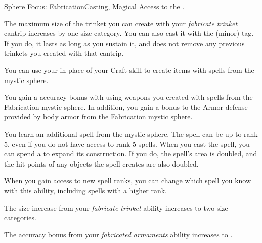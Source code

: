   \begin{magicalfeat}{Sphere Focus: Fabrication}{Casting, Magical}
    \featpre Access to the  .

     The maximum size of the trinket you can create with your \textit{fabricate trinket} cantrip increases by one size category.
    You can also cast it with the  (minor) tag.
    If you do, it lasts as long as you sustain it, and does not remove any previous trinkets you created with that cantrip.

     You can use your  in place of your Craft skill to create items with spells from the  mystic sphere.

     You gain a  accuracy bonus with  using weapons you created with spells from the Fabrication mystic sphere.
    In addition, you gain a  bonus to the Armor defense provided by body armor from the Fabrication mystic sphere.

     You learn an additional spell from the  mystic sphere.
    The spell can be up to rank 5, even if you do not have access to rank 5 spells.
    When you cast the spell, you can spend a  to expand its construction.
    If you do, the spell's area is doubled, and the hit points of any objects the spell creates are also doubled.

    When you gain access to new spell ranks, you can change which spell you know with this ability, including spells with a higher rank.

     The size increase from your \textit{fabricate trinket\plus} ability increases to two size categories.

     The accuracy bonus from your \textit{fabricated armaments} ability increases to .
  \end{magicalfeat}

